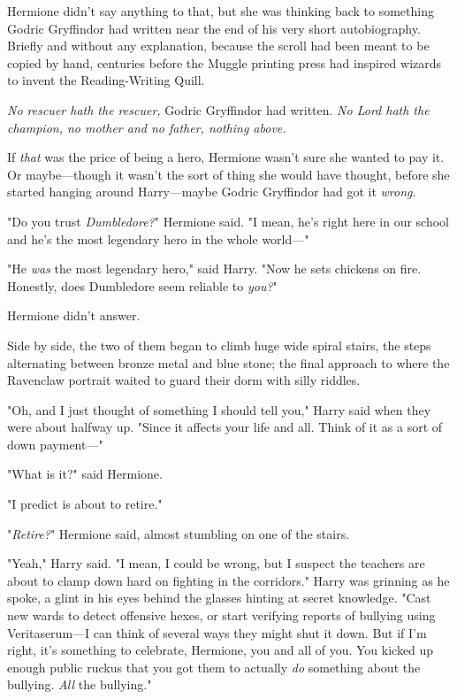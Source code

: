 Hermione didn't say anything to that, but she was thinking back to something
Godric Gryffindor had written near the end of his very short autobiography.
Briefly and without any explanation, because the scroll had been meant to be
copied by hand, centuries before the Muggle printing press had inspired wizards
to invent the Reading-Writing Quill.

\emph{No rescuer hath the rescuer,} Godric Gryffindor had written. \emph{No
Lord hath the champion, no mother and no father, nothing above.}

If \emph{that} was the price of being a hero, Hermione wasn't sure she wanted
to pay it. Or maybe—though it wasn't the sort of thing she would have
thought, before she started hanging around Harry—maybe Godric Gryffindor had
got it \emph{wrong}.

"Do you trust \emph{Dumbledore?}" Hermione said. "I mean, he's right here in
our school and he's the most legendary hero in the whole world—"

"He \emph{was} the most legendary hero," said Harry. "Now he sets chickens on
fire. Honestly, does Dumbledore seem reliable to \emph{you?}"

Hermione didn't answer.

Side by side, the two of them began to climb huge wide spiral stairs, the steps
alternating between bronze metal and blue stone; the final approach to where
the Ravenclaw portrait waited to guard their dorm with silly riddles.

"Oh, and I just thought of something I should tell you," Harry said when they
were about halfway up. "Since it affects your life and all. Think of it as a
sort of down payment—"

"What is it?" said Hermione.

"I predict \SPHEW is about to retire."

"\emph{Retire?}" Hermione said, almost stumbling on one of the stairs.

"Yeah," Harry said. "I mean, I could be wrong, but I suspect the teachers are
about to clamp down hard on fighting in the corridors." Harry was grinning as
he spoke, a glint in his eyes behind the glasses hinting at secret knowledge.
"Cast new wards to detect offensive hexes, or start verifying reports of
bullying using Veritaserum—I can think of several ways they might shut it
down. But if I'm right, it's something to celebrate, Hermione, you and all of
you. You kicked up enough public ruckus that you got them to actually \emph{do}
something about the bullying. \emph{All} the bullying."

